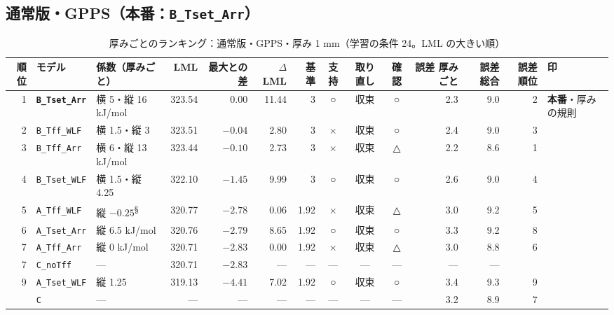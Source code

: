 \documentclass[paper=a4paper,landscape,fontsize=10pt,line_length=62zw,number_of_lines=34]{jlreq}
\let\origtextbf\textbf
\renewcommand{\textbf}[1]{\origtextbf{\gtfamily #1}}   %
\begin{document}
\subsection{通常版・GPPS（本番：\texttt{B\_\allowbreak{}Tset\_\allowbreak{}Arr}）}
\begin{table}[H]\centering\footnotesize
\caption{厚みごとのランキング：通常版・GPPS・厚み 1 mm（学習の条件 24。LML の大きい順）}
\begin{tabular}{rlp{11\zw}rrrrccc rrrl}
\toprule
順位 & モデル & 係数（厚みごと） & LML & 最大との差 & $\Delta$LML & 基準 & 支持 & 取り直し & 確認 & 誤差 厚みごと & 誤差 総合 & 誤差順位 & 印 \\
\midrule
1 & \textbf{\texttt{B\_\allowbreak{}Tset\_\allowbreak{}Arr}} & 横 5・縦 16 kJ/mol & 323.54 & 0.00 & 11.44 & 3 & ○ & 収束 & ○ & 2.3 & 9.0 & 2 & \textbf{本番}・厚みの規則 \\
2 & \texttt{B\_\allowbreak{}Tff\_\allowbreak{}WLF} & 横 1.5・縦 3 & 323.51 & $-0.04$ & 2.80 & 3 & × & 収束 & ○ & 2.4 & 9.0 & 3 &  \\
3 & \texttt{B\_\allowbreak{}Tff\_\allowbreak{}Arr} & 横 6・縦 13 kJ/mol & 323.44 & $-0.10$ & 2.73 & 3 & × & 収束 & △ & 2.2 & 8.6 & 1 &  \\
4 & \texttt{B\_\allowbreak{}Tset\_\allowbreak{}WLF} & 横 1.5・縦 4.25 & 322.10 & $-1.45$ & 9.99 & 3 & ○ & 収束 & ○ & 2.6 & 9.0 & 4 &  \\
5 & \texttt{A\_\allowbreak{}Tff\_\allowbreak{}WLF} & 縦 $-0.25$\textsuperscript{§} & 320.77 & $-2.78$ & 0.06 & 1.92 & × & 収束 & △ & 3.0 & 9.2 & 5 &  \\
6 & \texttt{A\_\allowbreak{}Tset\_\allowbreak{}Arr} & 縦 6.5 kJ/mol & 320.76 & $-2.79$ & 8.65 & 1.92 & ○ & 収束 & ○ & 3.3 & 9.2 & 8 &  \\
7 & \texttt{A\_\allowbreak{}Tff\_\allowbreak{}Arr} & 縦 0 kJ/mol & 320.71 & $-2.83$ & 0.00 & 1.92 & × & 収束 & △ & 3.0 & 8.8 & 6 &  \\
7 & \texttt{C\_\allowbreak{}noTff} & --- & 320.71 & $-2.83$ & --- & --- & --- & --- & --- & --- & --- &  &  \\
9 & \texttt{A\_\allowbreak{}Tset\_\allowbreak{}WLF} & 縦 1.25 & 319.13 & $-4.41$ & 7.02 & 1.92 & ○ & 収束 & ○ & 3.4 & 9.3 & 9 &  \\
 & \texttt{C} & --- & --- & --- & --- & --- & --- & --- & --- & 3.2 & 8.9 & 7 &  \\
\bottomrule
\end{tabular}
\end{table}
\end{document}
